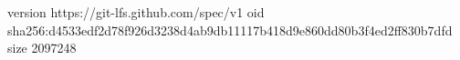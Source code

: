 version https://git-lfs.github.com/spec/v1
oid sha256:d4533edf2d78f926d3238d4ab9db11117b418d9e860dd80b3f4ed2ff830b7dfd
size 2097248
